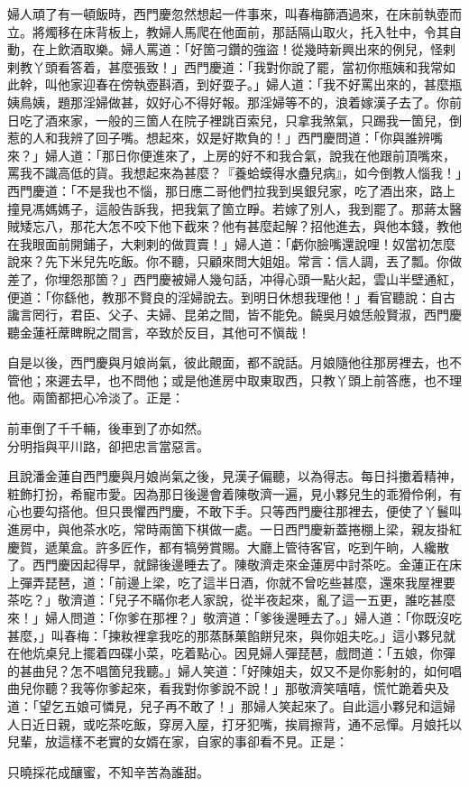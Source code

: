 婦人頑了有一頓飯時，西門慶忽然想起一件事來，叫春梅篩酒過來，在床前執壺而立。將燭移在床背板上，教婦人馬爬在他面前，那話隔山取火，托入牡中，令其自動，在上飲酒取樂。婦人罵道：「好箇刁鑽的強盜！從幾時新興出來的例兒，怪剌剌教丫頭看答着，甚麼張致！」西門慶道：「我對你說了罷，當初你瓶姨和我常如此幹，叫他家迎春在傍執壺斟酒，到好耍子。」婦人道：「我不好罵出來的，甚麼瓶姨鳥姨，題那淫婦做甚，奴好心不得好報。那淫婦等不的，浪着嫁漢子去了。你前日吃了酒來家，一般的三箇人在院子裡跳百索兒，只拿我煞氣，只踢我一箇兒，倒惹的人和我辨了回子嘴。想起來，奴是好欺負的！」西門慶問道：「你與誰辨嘴來？」婦人道：「那日你便進來了，上房的好不和我合氣，說我在他跟前頂嘴來，罵我不識高低的貨。我想起來為甚麼？『養蛤蟆得水蠱兒病』，如今倒教人惱我！」西門慶道：「不是我也不惱，那日應二哥他們拉我到吳銀兒家，吃了酒出來，路上撞見馮媽媽子，這般告訴我，把我氣了箇立睜。若嫁了別人，我到罷了。那蔣太醫賊矮忘八，那花大怎不咬下他下截來？{}他有甚麼起解？招他進去，與他本錢，教他在我眼面前開鋪子，大剌剌的做買賣！」婦人道：「虧你臉嘴還說哩！{}奴當初怎麼說來？先下米兒先吃飯。你不聽，只顧來問大姐姐。常言：信人調，丟了瓢。你做差了，你埋怨那箇？」西門慶被婦人幾句話，冲得心頭一點火起，雲山半壁通紅，便道：「你繇他，教那不賢良的淫婦說去。到明日休想我理他！」看官聽說：自古讒言罔行，君臣、父子、夫婦、昆弟之間，皆不能免。饒吳月娘恁般賢淑，西門慶聽金蓮衽蓆睥睨之間言，卒致於反目，其他可不愼哉！

自是以後，西門慶與月娘尚氣，彼此覿面，都不說話。月娘隨他往那房裡去，也不管他；來遲去早，也不問他；或是他進房中取東取西，只教丫頭上前答應，也不理他。兩箇都把心冷淡了。正是：

\begin{myquote}
前車倒了千千輛，後車到了亦如然。\\分明指與平川路，卻把忠言當惡言。
\end{myquote}

且說潘金蓮自西門慶與月娘尚氣之後，見漢子偏聽，以為得志。每日抖擻着精神，粧飾打扮，希寵市愛。因為那日後邊會着陳敬濟一遍，見小夥兒生的乖猾伶俐，有心也要勾搭他。但只畏懼西門慶，不敢下手。只等西門慶往那裡去，便使了丫鬟叫進房中，與他茶水吃，常時兩箇下棋做一處。一日西門慶新蓋捲棚上梁，親友掛紅慶賀，遞菓盒。許多匠作，都有犒勞賞賜。大廳上管待客官，吃到午晌，人纔散了。西門慶因起得早，就歸後邊睡去了。陳敬濟走來金蓮房中討茶吃。金蓮正在床上彈弄琵琶，道：「前邊上梁，吃了這半日酒，你就不曾吃些甚麼，還來我屋裡要茶吃？」敬濟道：「兒子不瞞你老人家說，從半夜起來，亂了這一五更，誰吃甚麼來！」婦人問道：「你爹在那裡？」{}敬濟道：「爹後邊睡去了。」婦人道：「你既沒吃甚麼，」叫春梅：「揀籹裡拿我吃的那蒸酥菓餡餅兒來，與你姐夫吃。」這小夥兒就在他炕桌兒上擺着四碟小菜，吃着點心。因見婦人彈琵琶，戲問道：「五娘，你彈的甚曲兒？怎不唱箇兒我聽。」婦人笑道：「好陳姐夫，奴又不是你影射的，{}如何唱曲兒你聽？我等你爹起來，看我對你爹說不說！」那敬濟笑嘻嘻，慌忙跪着央及道：「望乞五娘可憐見，兒子再不敢了！」{}那婦人笑起來了。自此這小夥兒和這婦人日近日親，或吃茶吃飯，穿房入屋，打牙犯嘴，挨肩擦背，通不忌憚。月娘托以兒輩，放這樣不老實的女婿在家，自家的事卻看不見。正是：

\begin{myquote}
只曉採花成釀蜜，不知辛苦為誰甜。
\end{myquote}

